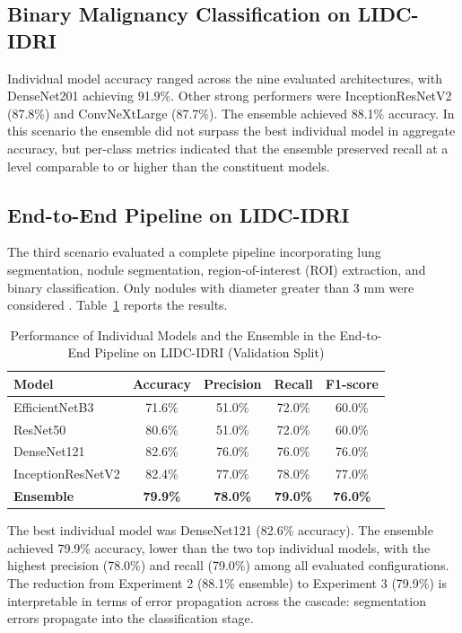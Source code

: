 \documentclass{ieeeaccess}
\begin{document}
\subsection{Binary Malignancy Classification on LIDC-IDRI}
Individual model accuracy ranged across the nine evaluated architectures, with DenseNet201 achieving 91.9\%. Other strong performers were InceptionResNetV2 (87.8\%) and ConvNeXtLarge (87.7\%). The ensemble achieved 88.1\% accuracy. In this scenario the ensemble did not surpass the best individual model in aggregate accuracy, but per-class metrics indicated that the ensemble preserved recall at a level comparable to or higher than the constituent models.

\subsection{End-to-End Pipeline on LIDC-IDRI}
The third scenario evaluated a complete pipeline incorporating lung segmentation, nodule segmentation, region-of-interest (ROI) extraction, and binary classification. Only nodules with diameter greater than 3 mm were considered \cite{macmahon2017}. Table~\ref{tab:e2e} reports the results.

\begin{table}[!t]
\caption{Performance of Individual Models and the Ensemble in the End-to-End Pipeline on LIDC-IDRI (Validation Split)}
\label{tab:e2e}
\centering
\begin{tabular}{@{}lcccc@{}}
\toprule
\textbf{Model} & \textbf{Accuracy} & \textbf{Precision} & \textbf{Recall} & \textbf{F1-score} \\
\midrule
EfficientNetB3 & 71.6\% & 51.0\% & 72.0\% & 60.0\% \\
ResNet50 & 80.6\% & 51.0\% & 72.0\% & 60.0\% \\
DenseNet121 & 82.6\% & 76.0\% & 76.0\% & 76.0\% \\
InceptionResNetV2 & 82.4\% & 77.0\% & 78.0\% & 77.0\% \\
\textbf{Ensemble} & \textbf{79.9\%} & \textbf{78.0\%} & \textbf{79.0\%} & \textbf{76.0\%} \\
\bottomrule
\end{tabular}
\end{table}

The best individual model was DenseNet121 (82.6\% accuracy). The ensemble achieved 79.9\% accuracy, lower than the two top individual models, with the highest precision (78.0\%) and recall (79.0\%) among all evaluated configurations. The reduction from Experiment 2 (88.1\% ensemble) to Experiment 3 (79.9\%) is interpretable in terms of error propagation across the cascade: segmentation errors propagate into the classification stage.
\end{document}
